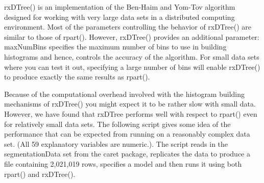 rxDTree() is an implementation of the Ben-Haim and Yom-Tov algorithm designed for working with very large data sets in a distributed computing environment. Most of the parameters controlling the behavior of rxDTree() are similar to those of rpart(). However, rxDTree() provides an additional parameter: maxNumBins specifies the maximum number of bins to use in building histograms and hence, controls the accuracy of the algorithm. For small data sets where you can test it out, specifying a large number of bins will enable rxDTree() to produce exactly the same results as rpart().

Because of the computational overhead involved with the histogram building mechanisms of rxDTree() you might expect it to be rather slow with small data. However, we have found that rxDTree performs well with respect to rpart() even for relatively small data sets. The following script gives some idea of the performance that can be expected from running on a reasonably complex data set. (All 59 explanatory variables are numeric.). The script reads in the segmentationData set from the caret package, replicates the data to produce a file containing 2,021,019 rows, specifies a model and then runs it using both rpart() and rxDTree().

